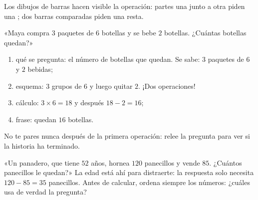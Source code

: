 \begin{omfigure}

{\small Los dibujos de barras hacen visible la operación: partes una junto a otra
piden una ; dos barras comparadas piden una resta.}
\end{omfigure}

\begin{example}\label{ex:g3:problems:twostep}
«Maya compra $3$ paquetes de $6$ botellas y se bebe $2$ botellas. ¿Cuántas
botellas quedan?»
\begin{enumerate}
  \item qué se pregunta: el número de botellas que quedan. Se sabe: $3$
        paquetes de $6$ y $2$ bebidas;
  \item esquema: $3$ grupos de $6$ y luego quitar $2$. ¡Dos
        operaciones!
  \item cálculo: $3 \times 6 = 18$ y después $18 - 2 = 16$;
  \item frase: quedan $16$ botellas.
\end{enumerate}
No te pares nunca después de la primera operación: relee la pregunta para ver
si la historia ha terminado.
\end{example}

\begin{example}\label{ex:g3:problems:trap}
«Un panadero, que tiene $52$ años, hornea $120$ panecillos y vende $85$.
¿Cuántos panecillos le quedan?» La edad está ahí para distraerte: la
respuesta solo necesita $120 - 85 = 35$ panecillos. Antes de calcular, ordena
siempre los números: ¿cuáles usa de verdad la pregunta?
\end{example}

